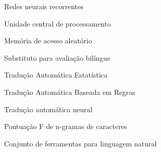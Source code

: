 \begin{siglas}
  \item[RNN] Redes neurais recorrentes
  \item[CPU] Unidade central de processamento
  \item[RAM] Memória de acesso aleatório
  \item[BLEU] Substituto para avaliação bilíngue
  \item[SMT] Tradução Automática Estatística
  \item[RBMT] Tradução Automática Baseada em Regras
  \item[NMT] Tradução automática neural
  \item[chrF] Pontuação F de n-gramas de caracteres
  \item[NLTK] Conjunto de ferramentas para linguagem natural
\end{siglas}